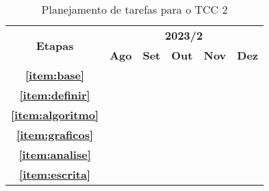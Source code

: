  \begin{table}[h]
      \centering
      \begin{tabular}{|c|c|c|c|c|c|}
    	\hline
    	\multirow{2}{*}{\textbf{\small{Etapas}}} &
    	\multicolumn{5}{|c|}{\textbf{\small{2023/2}}} \\
    	\cline{2-6}
    	& \textbf{Ago} &  \textbf{Set} & \textbf{Out} & \textbf{Nov} & \textbf{Dez} \\
    	\hline
    	\textbf{\small{\ref{item:base}}} & \cellcolor{gray}  &  \cellcolor{gray} &  \cellcolor{gray} &\cellcolor{gray} &  \\
    	\hline
        \textbf{\small{\ref{item:definir}}} & \cellcolor{gray}  &   &   & &  \\
    	\hline
    	\textbf{\small{\ref{item:algoritmo}}}  & \cellcolor{gray} & \cellcolor{gray} & \cellcolor{gray} \cellcolor{gray}& & \\
    	\hline
    	\textbf{\small{\ref{item:graficos}}} & \cellcolor{gray}  & \cellcolor{gray} & \cellcolor{gray} \cellcolor{gray} & \cellcolor{gray} &  \\
    	\hline
        \textbf{\small{\ref{item:analise}}}  & \cellcolor{gray}  & \cellcolor{gray} & \cellcolor{gray} \cellcolor{gray} & \cellcolor{gray} &  \\
    	\hline
    	\textbf{\small{\ref{item:escrita}}}  & \cellcolor{gray} & \cellcolor{gray} & \cellcolor{gray} \cellcolor{gray} & \cellcolor{gray} & \cellcolor{gray} \\
    	\hline
	\end{tabular}
 
      \caption{Planejamento de tarefas para o TCC 2}
      \label{tabela}
  \end{table}
